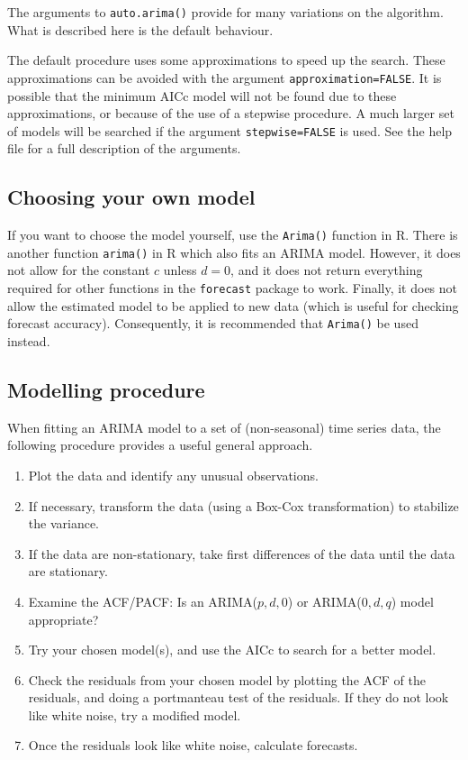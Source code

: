 \documentclass[]{book}
\providecommand{\tightlist}{%
  \setlength{\itemsep}{0pt}\setlength{\parskip}{0pt}}
\begin{document}
The arguments to \texttt{auto.arima()} provide for many variations on the algorithm. What is described here is the default behaviour.

The default procedure uses some approximations to speed up the search. These approximations can be avoided with the argument \texttt{approximation=FALSE}. It is possible that the minimum AICc model will not be found due to these approximations, or because of the use of a stepwise procedure. A much larger set of models will be searched if the argument \texttt{stepwise=FALSE} is used. See the help file for a full description of the arguments.

\hypertarget{choosing-your-own-model}{%
\subsection*{Choosing your own model}\label{choosing-your-own-model}}

If you want to choose the model yourself, use the \texttt{Arima()} function in R. There is another function \texttt{arima()} in R which also fits an ARIMA model. However, it does not allow for the constant \(c\) unless \(d=0\), and it does not return everything required for other functions in the \texttt{forecast} package to work. Finally, it does not allow the estimated model to be applied to new data (which is useful for checking forecast accuracy). Consequently, it is recommended that \texttt{Arima()} be used instead.

\hypertarget{modelling-procedure}{%
\subsection*{Modelling procedure}\label{modelling-procedure}}

When fitting an ARIMA model to a set of (non-seasonal) time series data, the following procedure provides a useful general approach.

\begin{enumerate}
\def\labelenumi{\arabic{enumi}.}
\tightlist
\item
  Plot the data and identify any unusual observations.
\item
  If necessary, transform the data (using a Box-Cox transformation) to stabilize the variance.
\item
  If the data are non-stationary, take first differences of the data until the data are stationary.
\item
  Examine the ACF/PACF: Is an ARIMA(\(p,d,0\)) or ARIMA(\(0,d,q\)) model appropriate?
\item
  Try your chosen model(s), and use the AICc to search for a better model.
\item
  Check the residuals from your chosen model by plotting the ACF of the residuals, and doing a portmanteau test of the residuals. If they do not look like white noise, try a modified model.
\item
  Once the residuals look like white noise, calculate forecasts.
\end{enumerate}
\end{document}
